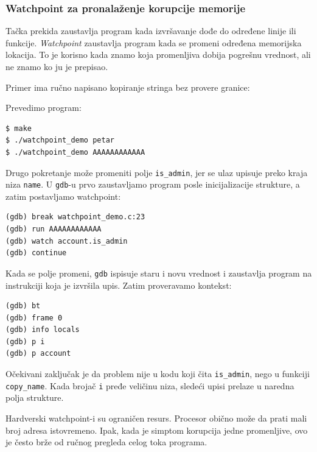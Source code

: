 \subsubsection{Watchpoint za pronalaženje korupcije memorije}\label{gdb-watchpoints}

Tačka prekida zaustavlja program kada izvršavanje dođe do određene linije ili funkcije. \emph{Watchpoint} zaustavlja program kada se promeni određena memorijska lokacija. To je korisno kada znamo koja promenljiva dobija pogrešnu vrednost, ali ne znamo ko ju je prepisao.

Primer ima ručno napisano kopiranje stringa bez provere granice:


Prevedimo program:

\begin{verbatim}
$ make
$ ./watchpoint_demo petar
$ ./watchpoint_demo AAAAAAAAAAAA
\end{verbatim}

Drugo pokretanje može promeniti polje \texttt{is\_admin}, jer se ulaz upisuje preko kraja niza \texttt{name}. U \texttt{gdb}-u prvo zaustavljamo program posle inicijalizacije strukture, a zatim postavljamo watchpoint:

\begin{verbatim}
(gdb) break watchpoint_demo.c:23
(gdb) run AAAAAAAAAAAA
(gdb) watch account.is_admin
(gdb) continue
\end{verbatim}

Kada se polje promeni, \texttt{gdb} ispisuje staru i novu vrednost i zaustavlja program na instrukciji koja je izvršila upis. Zatim proveravamo kontekst:

\begin{verbatim}
(gdb) bt
(gdb) frame 0
(gdb) info locals
(gdb) p i
(gdb) p account
\end{verbatim}

Očekivani zaključak je da problem nije u kodu koji čita \texttt{is\_admin}, nego u funkciji \texttt{copy\_name}. Kada brojač \texttt{i} pređe veličinu niza, sledeći upisi prelaze u naredna polja strukture.

Hardverski watchpoint-i su ograničen resurs. Procesor obično može da prati mali broj adresa istovremeno. Ipak, kada je simptom korupcija jedne promenljive, ovo je često brže od ručnog pregleda celog toka programa.

